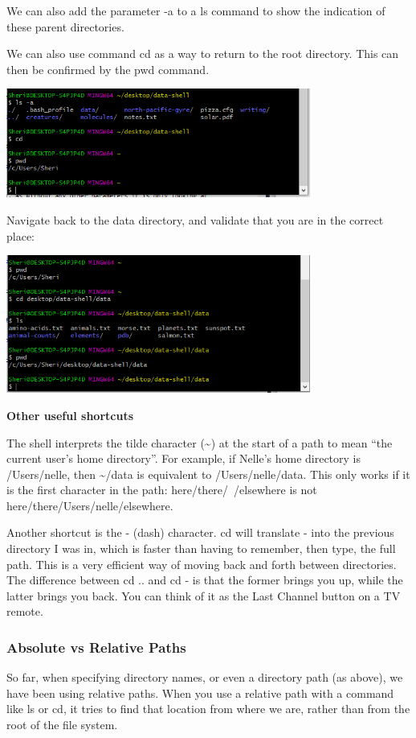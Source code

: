 \documentclass{article}
\begin{document}
We can also add the parameter -a to a ls command to show the indication of these parent directories.

We can also use command cd as a way to return to the root directory. This can then be confirmed by the pwd command.

\includegraphics[width=10cm]{Images/GitBash_010.PNG}

Navigate back to the data directory, and validate that you are in the correct place:

\includegraphics[width=10cm]{Images/GitBash_011.PNG}

\textbf{Other useful shortcuts}

The shell interprets the tilde character (\~{}) at the start of a path to mean ``the current user’s home directory''. For example, if Nelle’s home directory is /Users/nelle, then \~{}/data is equivalent to /Users/nelle/data. This only works if it is the first character in the path: here/there/~/elsewhere is not here/there/Users/nelle/elsewhere.

Another shortcut is the - (dash) character. cd will translate - into the previous directory I was in, which is faster than having to remember, then type, the full path. This is a very efficient way of moving back and forth between directories. The difference between cd .. and cd - is that the former brings you up, while the latter brings you back. You can think of it as the Last Channel button on a TV remote.

\subsubsection{Absolute vs Relative Paths}
So far, when specifying directory names, or even a directory path (as above), we have been using relative paths. When you use a relative path with a command like ls or cd, it tries to find that location from where we are, rather than from the root of the file system.
\end{document}
